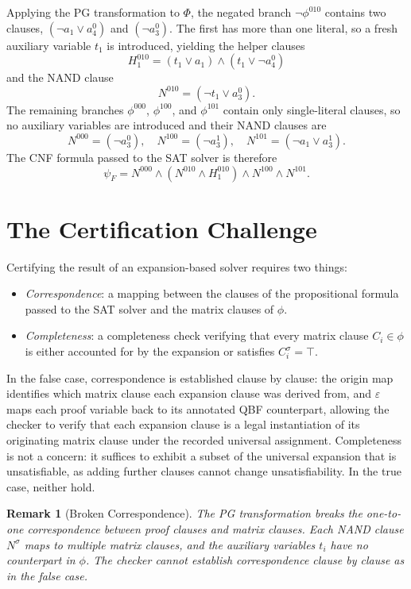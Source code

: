 \documentclass{article}
\newtheorem*{remark}{Remark}
\begin{document}
Applying the PG transformation to $\Phi$, the negated branch $\neg\phi^{010}$
contains two clauses, $(\neg a_1 \vee a_4^0)$ and $(\neg a_3^0)$. The first has
more than one literal, so a fresh auxiliary variable $t_1$ is introduced, yielding
the helper clauses
\[
    H_1^{010} = (t_1 \vee a_1) \wedge (t_1 \vee \neg a_4^0)
\]
and the NAND clause
\[
    N^{010} = (\neg t_1 \vee a_3^0).
\]
The remaining branches $\phi^{000}$, $\phi^{100}$, and $\phi^{101}$ contain only
single-literal clauses, so no auxiliary variables are introduced and their NAND
clauses are
\[
    N^{000} = (\neg a_3^0), \quad N^{100} = (\neg a_3^1), \quad
    N^{101} = (\neg a_1 \vee a_3^1).
\]
The CNF formula passed to the SAT solver is therefore
\[
    \psi_F = N^{000} \wedge (N^{010} \wedge H_1^{010}) \wedge N^{100} \wedge N^{101}.
\]


\section{The Certification Challenge}
\label{sec:challenge}

Certifying the result of an expansion-based solver requires two things:
\begin{itemize}
    \item \emph{Correspondence}: a mapping between the clauses of the propositional
          formula passed to the SAT solver and the matrix clauses of $\phi$.
    \item \emph{Completeness}: a completeness check verifying that every matrix
          clause $C_i \in \phi$ is either accounted for by the expansion or
          satisfies $C_i^\sigma = \top$.
\end{itemize}
In the false case, correspondence is established clause by clause: the origin map
identifies which matrix clause each expansion clause was derived from, and
$\varepsilon$ maps each proof variable back to its annotated QBF counterpart,
allowing the checker to verify that each expansion clause is a legal instantiation
of its originating matrix clause under the recorded universal assignment.
Completeness is not a concern: it suffices to exhibit a subset of the universal
expansion that is unsatisfiable, as adding further clauses cannot change
unsatisfiability. In the true case, neither hold.

\begin{remark}[Broken Correspondence]
    \label{rem:correspondence}
    The PG transformation breaks the one-to-one correspondence between proof
    clauses and matrix clauses. Each NAND clause $N^\sigma$ maps to multiple
    matrix clauses, and the auxiliary variables $t_i$ have no counterpart in
    $\phi$. The checker cannot establish correspondence clause by clause as in
    the false case.
\end{remark}
\end{document}
